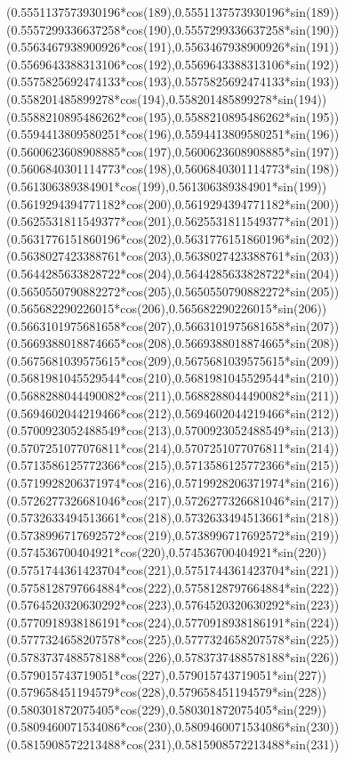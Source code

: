 {({0.5551137573930196*cos(189)},{0.5551137573930196*sin(189)})
({0.5557299336637258*cos(190)},{0.5557299336637258*sin(190)})
({0.5563467938900926*cos(191)},{0.5563467938900926*sin(191)})
({0.5569643388313106*cos(192)},{0.5569643388313106*sin(192)})
({0.5575825692474133*cos(193)},{0.5575825692474133*sin(193)})
({0.558201485899278*cos(194)},{0.558201485899278*sin(194)})
({0.5588210895486262*cos(195)},{0.5588210895486262*sin(195)})
({0.5594413809580251*cos(196)},{0.5594413809580251*sin(196)})
({0.5600623608908885*cos(197)},{0.5600623608908885*sin(197)})
({0.5606840301114773*cos(198)},{0.5606840301114773*sin(198)})
({0.561306389384901*cos(199)},{0.561306389384901*sin(199)})
({0.5619294394771182*cos(200)},{0.5619294394771182*sin(200)})
({0.5625531811549377*cos(201)},{0.5625531811549377*sin(201)})
({0.5631776151860196*cos(202)},{0.5631776151860196*sin(202)})
({0.5638027423388761*cos(203)},{0.5638027423388761*sin(203)})
({0.5644285633828722*cos(204)},{0.5644285633828722*sin(204)})
({0.5650550790882272*cos(205)},{0.5650550790882272*sin(205)})
({0.565682290226015*cos(206)},{0.565682290226015*sin(206)})
({0.5663101975681658*cos(207)},{0.5663101975681658*sin(207)})
({0.5669388018874665*cos(208)},{0.5669388018874665*sin(208)})
({0.5675681039575615*cos(209)},{0.5675681039575615*sin(209)})
({0.5681981045529544*cos(210)},{0.5681981045529544*sin(210)})
({0.5688288044490082*cos(211)},{0.5688288044490082*sin(211)})
({0.5694602044219466*cos(212)},{0.5694602044219466*sin(212)})
({0.5700923052488549*cos(213)},{0.5700923052488549*sin(213)})
({0.5707251077076811*cos(214)},{0.5707251077076811*sin(214)})
({0.5713586125772366*cos(215)},{0.5713586125772366*sin(215)})
({0.5719928206371974*cos(216)},{0.5719928206371974*sin(216)})
({0.5726277326681046*cos(217)},{0.5726277326681046*sin(217)})
({0.5732633494513661*cos(218)},{0.5732633494513661*sin(218)})
({0.5738996717692572*cos(219)},{0.5738996717692572*sin(219)})
({0.574536700404921*cos(220)},{0.574536700404921*sin(220)})
({0.5751744361423704*cos(221)},{0.5751744361423704*sin(221)})
({0.5758128797664884*cos(222)},{0.5758128797664884*sin(222)})
({0.5764520320630292*cos(223)},{0.5764520320630292*sin(223)})
({0.5770918938186191*cos(224)},{0.5770918938186191*sin(224)})
({0.5777324658207578*cos(225)},{0.5777324658207578*sin(225)})
({0.5783737488578188*cos(226)},{0.5783737488578188*sin(226)})
({0.579015743719051*cos(227)},{0.579015743719051*sin(227)})
({0.579658451194579*cos(228)},{0.579658451194579*sin(228)})
({0.580301872075405*cos(229)},{0.580301872075405*sin(229)})
({0.5809460071534086*cos(230)},{0.5809460071534086*sin(230)})
({0.5815908572213488*cos(231)},{0.5815908572213488*sin(231)})
}
